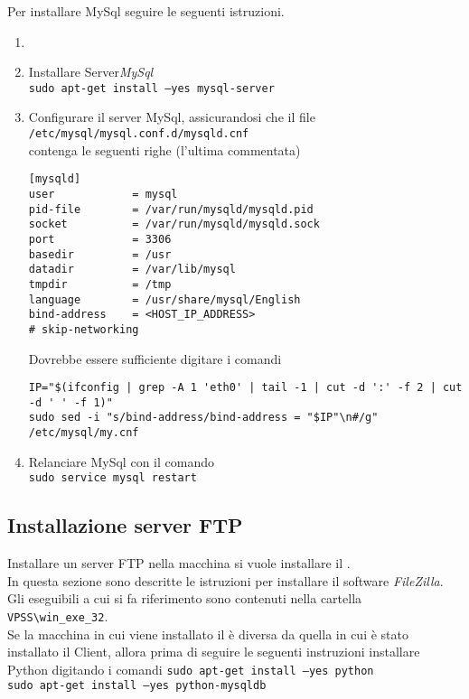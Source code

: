 \documentclass[a4paper,twoside,10pt,openany]{scrbook}
\begin{document}
Per installare MySql seguire le seguenti istruzioni.
\begin{enumerate}
 \item \item Installare Server\emph{MySql}\\
       \texttt{sudo apt-get install --yes mysql-server}\\
       
 \item Configurare il server MySql, assicurandosi che il file
       \texttt{/etc/mysql/mysql.conf.d/mysqld.cnf}\\
       contenga le seguenti righe (l'ultima commentata)
\begin{verbatim}
[mysqld]
user            = mysql
pid-file        = /var/run/mysqld/mysqld.pid
socket          = /var/run/mysqld/mysqld.sock
port            = 3306
basedir         = /usr
datadir         = /var/lib/mysql
tmpdir          = /tmp
language        = /usr/share/mysql/English
bind-address    = <HOST_IP_ADDRESS>
# skip-networking
\end{verbatim}
       Dovrebbe essere sufficiente digitare i comandi
\begin{verbatim}
IP="$(ifconfig | grep -A 1 'eth0' | tail -1 | cut -d ':' -f 2 | cut -d ' ' -f 1)"
sudo sed -i "s/bind-address/bind-address = "$IP"\n#/g" /etc/mysql/my.cnf
\end{verbatim}
%
 \item Relanciare MySql con il comando\\
       \texttt{sudo service mysql restart}
\end{enumerate}

%
\subsection{Installazione server FTP}\label{sec:installazione_ftp_ubu}
%
Installare un server FTP nella macchina si vuole installare il \sa.\\
In questa sezione sono descritte le istruzioni per installare il software \emph{FileZilla}.\\
Gli eseguibili a cui si fa riferimento sono contenuti nella cartella \texttt{VPSS\textbackslash win\_exe\_32}.\\
Se la macchina in cui viene installato il \sa è diversa da quella in cui è stato installato il Client, allora prima di seguire le seguenti instruzioni installare Python digitando i comandi
\texttt{sudo apt-get install --yes python}\\
\texttt{sudo apt-get install --yes python-mysqldb}\\
\end{document}
